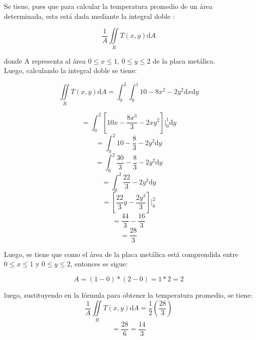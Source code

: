 \documentclass[a4paper,12pt]{article}
\begin{document}
	Se tiene, pues que para calcular la temperatura promedio de un área
	determinada, esta está dada mediante la integral doble :

		$$ \frac{1}{A}  \iint\limits_{R} T(x,y)\mathrm{d}A   $$

	donde A representa al área $ 0 \leq x \leq 1$, $ 0 \leq y \leq 2 $ de la
	placa metálica.\\

	Luego, calculando la integral doble se tiene:

		$$ \iint\limits_{R} T(x,y)\mathrm{d}A  =
			\int_{0}^{2} \int_{0}^{1} 10 - 8x^2 - 2y^2 \mathrm{d}x \mathrm{d}y   $$

		$$ = \int_{0}^{2} [ 10x - \frac{8x^3}{3} - 2xy^2 ] \Big|_0^1 \mathrm{d}y $$
		$$ = \int_{0}^{2} 10 - \frac{8}{3} - 2y^2  \mathrm{d}y $$
		$$ = \int_{0}^{2} \frac{30}{3} - \frac{8}{3} - 2y^2 \mathrm{d}y $$
		$$ = \int_{0}^{2} \frac{22}{3} - 2y^2 \mathrm{d}y $$
		$$ = [ \frac{22}{3}y - \frac{2y^3}{3} ] \Big|_0^2$$
		$$ = \frac{44}{3} - \frac{16}{3} $$
		$$ = \frac{28}{3} $$

	Luego, se tiene que como el área de la placa metálica está comprendida entre
	$ 0 \leq x \leq 1 $ y $ 0 \leq y \leq 2 $, entonces se sigue:

	 	$$ A = (1 - 0) * (2 - 0) = 1 * 2 = 2  $$

	luego, sustituyendo en la fórmula para obtener la temperatura promedio, se
	tiene:
		$$ \frac{1}{A}  \iint\limits_{R} T(x,y)\mathrm{d}A  = \frac{1}{2} (\frac{28}{3}) $$
		$$ = \frac{28}{6} = \frac{14}{3} $$
\end{document}
